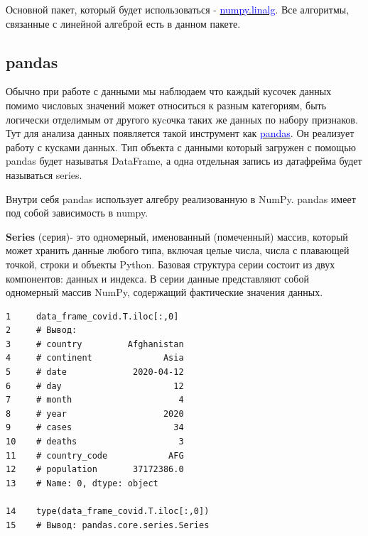 \documentclass[12pt, a4paper]{article}
\begin{document}
{\vspace{1em}

Основной пакет, который будет использоваться - 
\href{https://numpy.org/doc/stable/reference/routines.linalg.html}
{\textcolor{blue}{numpy.linalg}}. Все алгоритмы, связанные 
с линейной алгеброй есть в данном пакете.

\subsection{pandas}

Обычно при работе с данными мы наблюдаем что каждый кусочек 
данных помимо числовых значений может относиться к разным 
категориям, быть логически отделимым от другого куcочка таких 
же данных по набору признаков. Тут для анализа данных 
появляется такой инструмент как 
\href{https://pandas.pydata.org/docs/getting_started/index.html}
{\textcolor{blue}{pandas}}. Он реализует работу 
с кусками данных. Тип объекта с данными который загружен 
с помощью pandas будет называтья DataFrame, а одна отдельная 
запись из датафрейма будет называться series.

\vspace{1em}

Внутри себя pandas использует алгебру реализованную в NumPy.
pandas имеет под собой зависимость в numpy. 

\vspace{1em}

\textbf{Series} (серия)- это одномерный, именованный (помеченный) массив, 
который может хранить данные любого типа, включая целые числа, 
числа с плавающей точкой, строки и объекты Python. Базовая 
структура серии состоит из двух компонентов: данных и индекса.
В серии данные представляют собой одномерный массив NumPy, 
содержащий фактические значения данных.

\newpage

\begin{verbatim}
1     data_frame_covid.T.iloc[:,0]
2     # Вывод:
3     # country         Afghanistan
4     # continent              Asia
5     # date             2020-04-12
6     # day                      12
7     # month                     4
8     # year                   2020
9     # cases                    34
10    # deaths                    3
11    # country_code            AFG
12    # population       37172386.0
13    # Name: 0, dtype: object

14    type(data_frame_covid.T.iloc[:,0])
15    # Вывод: pandas.core.series.Series
\end{verbatim}

}
\end{document}
